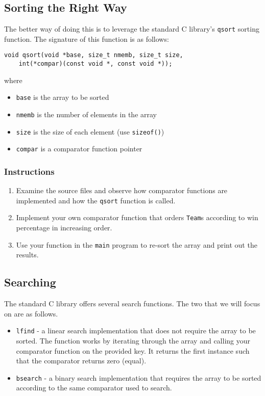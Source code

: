\documentclass[12pt]{scrartcl}
\begin{document}
\subsection{Sorting the Right Way}

The better way of doing this is to leverage the standard C library's 
\texttt{qsort} sorting function.  The signature of this function 
is as follows:

\begin{verbatim}
void qsort(void *base, size_t nmemb, size_t size, 
	int(*compar)(const void *, const void *));
\end{verbatim}

where
\begin{itemize}
  \item \texttt{base} is the array to be sorted
  \item \texttt{nmemb} is the number of elements in the array  
  \item \texttt{size} is the size of each element (use \texttt{sizeof()})
  \item \texttt{compar} is a comparator function pointer
\end{itemize}

\subsubsection*{Instructions}

\begin{enumerate}
  \item Examine the source files and observe how comparator functions 
	are implemented and how the \texttt{qsort} function is called.
  \item Implement your own comparator function that orders \texttt{Team}s 
	according to win percentage in increasing order.
  \item Use your function in the  \texttt{main} program to re-sort the 
	array and print out the results.
\end{enumerate}
	
\subsection{Searching}

The standard C library offers several search functions.  The two that we 
will focus on are as follows.
\begin{itemize}
  \item \texttt{lfind} - a linear search implementation that does not 
  	require the array to be sorted.  The function works by iterating through 
	the array and calling your comparator function on the provided key.  
	It returns the first instance such that the comparator returns zero (equal).
  \item \texttt{bsearch} - a binary search implementation that requires 
  	the array to be sorted according to the same comparator used to search.
\end{itemize}
	
\end{document}
